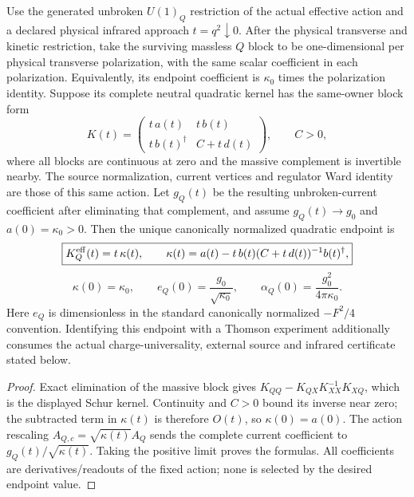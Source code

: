 \documentclass[12pt,a4paper]{article}
\begin{document}
\begin{theorem}
\label{p5c:thm:v2210-lit-thomson-response}
Use the generated unbroken \(U(1)_Q\) restriction of the actual effective
action and a declared physical infrared approach \(t=q^2\downarrow0\).
After the physical transverse and kinetic restriction, take the surviving
massless \(Q\) block to be one-dimensional per physical transverse
polarization, with the same scalar coefficient in each polarization.
Equivalently, its endpoint coefficient is \(\kappa_0\) times the
polarization identity.  Suppose its complete neutral quadratic kernel
has the same-owner block form
\[
 K(t)=\begin{pmatrix}
 t\,a(t)&t\,b(t)\\
 t\,b(t)^\dagger&C+t\,d(t)
 \end{pmatrix},\qquad C>0,
\]
where all blocks are continuous at zero and the massive complement is
invertible nearby.  The source normalization, current vertices and regulator
Ward identity are those of this same action.  Let \(g_Q(t)\) be the
resulting unbroken-current coefficient after eliminating that complement,
and assume \(g_Q(t)\to g_0\) and \(a(0)=\kappa_0>0\).
Then the unique canonically normalized quadratic endpoint is
\[
 \boxed{K_Q^{\rm eff}(t)=t\,\kappa(t),\qquad
 \kappa(t)=a(t)-t\,b(t)(C+t\,d(t))^{-1}b(t)^\dagger,}
\]
\[
 \boxed{\kappa(0)=\kappa_0,\qquad
 e_Q(0)=\frac{g_0}{\sqrt{\kappa_0}},\qquad
 \alpha_Q(0)=\frac{g_0^2}{4\pi\kappa_0}.}
\]
Here \(e_Q\) is dimensionless in the standard canonically normalized
\(-F^2/4\) convention.  Identifying this endpoint with a Thomson
experiment additionally consumes the actual charge-universality, external
source and infrared certificate stated below.
\end{theorem}
\begin{proof}
Exact elimination of the massive block gives
\(K_{QQ}-K_{QX}K_{XX}^{-1}K_{XQ}\), which is the displayed Schur kernel.
Continuity and \(C>0\) bound its inverse near zero; the subtracted term
in \(\kappa(t)\) is therefore \(O(t)\), so \(\kappa(0)=a(0)\).
The action rescaling \(A_{Q,c}=\sqrt{\kappa(t)}A_Q\) sends the complete
current coefficient to \(g_Q(t)/\sqrt{\kappa(t)}\).  Taking the positive
limit proves the formulas.  All coefficients are derivatives/readouts of
the fixed action; none is selected by the desired endpoint value.
\end{proof}
\end{document}
